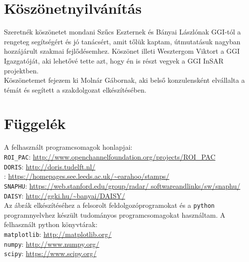 \documentclass[12pt]{report}
\numberwithin{equation}{section}
\numberwithin{table}{section}
\numberwithin{figure}{section}
\begin{document}
\chapter*{Köszönetnyilvánítás}

Szeretnék köszönetet mondani Szűcs Eszternek és Bányai Lászlónak GGI-tól a rengeteg segítségért és jó tanácsért, amit tőlük kaptam, útmutatásuk nagyban hozzájárult szakmai fejlődésemhez.
Köszönet illeti Wesztergom Viktort a GGI Igazgatóját, aki lehetővé tette azt, hogy én is részt vegyek a GGI InSAR projektben.\\[25pt]
Köszönetemet fejezem ki Molnár Gábornak, aki belső konzulensként elvállalta a témát és segített a szakdolgozat elkészítésében.

\newpage

\chapter*{Függelék}

A felhasznált programcsomagok honlapjai:\\
\texttt{ROI\_PAC}: \url{http://www.openchannelfoundation.org/projects/ROI_PAC}\\
\texttt{DORIS}: \url{http://doris.tudelft.nl/}\\
\stamps: \url{https://homepages.see.leeds.ac.uk/~earahoo/stamps/}\\
\texttt{SNAPHU}: \url{https://web.stanford.edu/group/radar/ softwareandlinks/sw/snaphu/}\\
\texttt{DAISY}: \url{http://ggki.hu/~banyai/DAISY/}\\[25pt]
Az ábrák elkészítéséhez a felsorolt feldolgozóprogramokat és a \texttt{python} programnyelvhez készült tudományos programcsomagokat használtam. A felhasznált python könyvtárak:\\
\texttt{matplotlib}: \url{http://matplotlib.org/} \cite{matplotlib}\\
\texttt{numpy}: \url{http://www.numpy.org/} \cite{numpy}\\
\texttt{scipy}: \url{https://www.scipy.org/} \cite{scipy}

\listoftables
\listoffigures




\newpage
\end{document}
